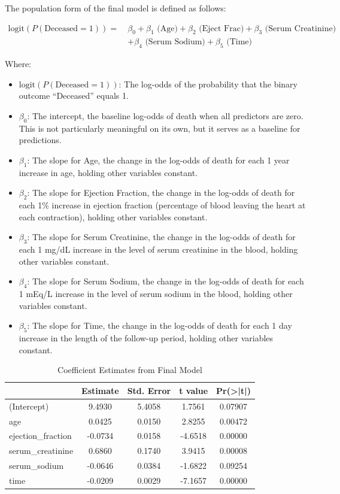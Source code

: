\documentclass[
  letterpaper,
  DIV=11,
  numbers=noendperiod]{scrartcl}
\begin{document}
The population form of the final model is defined as follows:

\[
\begin{aligned}
\text{logit}(P(\text{Deceased} = 1)) =\ & \beta_0 + \beta_1 \text{ (Age)} + \beta_2 \text{ (Eject Frac)} + \beta_3 \text{ (Serum Creatinine)} \\
& + \beta_4 \text{ (Serum Sodium}) + \beta_5 \text{ (Time)}
\end{aligned}
\]

Where:

\begin{itemize}
\item
  \(\text{logit}(P(\text{Deceased} = 1))\): The log-odds of the
  probability that the binary outcome ``Deceased'' equals 1.
\item
  \(\beta_0\): The intercept, the baseline log-odds of death when all
  predictors are zero. This is not particularly meaningful on its own,
  but it serves as a baseline for predictions.
\item
  \(\beta_1\): The slope for Age, the change in the log-odds of death
  for each 1 year increase in age, holding other variables constant.
\item
  \(\beta_2\): The slope for Ejection Fraction, the change in the
  log-odds of death for each 1\% increase in ejection fraction
  (percentage of blood leaving the heart at each contraction), holding
  other variables constant.
\item
  \(\beta_3\): The slope for Serum Creatinine, the change in the
  log-odds of death for each 1 mg/dL increase in the level of serum
  creatinine in the blood, holding other variables constant.
\item
  \(\beta_4\): The slope for Serum Sodium, the change in the log-odds of
  death for each 1 mEq/L increase in the level of serum sodium in the
  blood, holding other variables constant.
\item
  \(\beta_5\): The slope for Time, the change in the log-odds of death
  for each 1 day increase in the length of the follow-up period, holding
  other variables constant.
\end{itemize}

\begin{table}[H]
\centering
\caption{Coefficient Estimates from Final Model}
\centering
\begin{tabular}[t]{lcccc}
\toprule
  & Estimate & Std. Error & t value & Pr(>|t|)\\
\midrule
(Intercept) & 9.4930 & 5.4058 & 1.7561 & 0.07907\\
age & 0.0425 & 0.0150 & 2.8255 & 0.00472\\
ejection\_fraction & -0.0734 & 0.0158 & -4.6518 & 0.00000\\
serum\_creatinine & 0.6860 & 0.1740 & 3.9415 & 0.00008\\
serum\_sodium & -0.0646 & 0.0384 & -1.6822 & 0.09254\\
time & -0.0209 & 0.0029 & -7.1657 & 0.00000\\
\bottomrule
\end{tabular}
\end{table}
\end{document}

